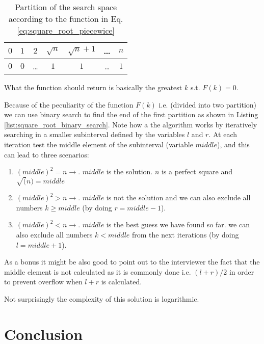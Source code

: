\begin{table}[]
	\centering
	\begin{tabular}{|c|c|c|c|c|c|c|}
		\hline
		$0$ & $1$ & $2$   & $\sqrt{n}$ & $\sqrt{n}+1$ & \ldots   & $n$ \\ \hline
		$0$ & $0$ & \ldots & $1$ & $1$ & \ldots & $1$   \\ \hline
	\end{tabular}
	\caption{Partition of the search space according to the function in Eq. \ref{eq:square_root_piecewice}}
	\label{tab:sqrt_split_space}
\end{table}
What the function should return is basically the greatest $k$ s.t. $F(k)=0$. 

Because of the peculiarity of the function $F(k)$ i.e. (divided into two partition) we can use binary search to find the end of the first partition as shown in Listing \ref{list:square_root_binary_search}. Note how a the algorithm works by iteratively searching in a smaller subinterval defined by the variables $l$ and $r$. At each iteration test the middle element of the subinterval (variable $middle$), and this can lead to three scenarios:

\begin{enumerate}
 	\item $(middle)^2  = n \longrightarrow$. $middle$ is the solution. $n$ is a perfect square and $\sqrt(n)=middle$
 	\item $(middle)^2  > n \longrightarrow$. $middle$ is not the solution and we can also exclude all numbers $k \geq middle$ (by doing $r = middle-1$).
 	\item $(middle)^2  < n \longrightarrow$. $middle$ is the best guess we have found so far. we can also exclude all numbers $k < middle$ from the next iterations (by doing $l = middle+1$).
\end{enumerate}
As a bonus it might be also good to point out to the interviewer the fact that the middle element is not calculated as it is commonly done i.e. $(l+r)/2$ in order to prevent overflow when $l+r$ is calculated.

\begin{minipage}{\linewidth}

	
\end{minipage}

Not surprisingly the complexity of this solution is logarithmic.


\section{Conclusion}
